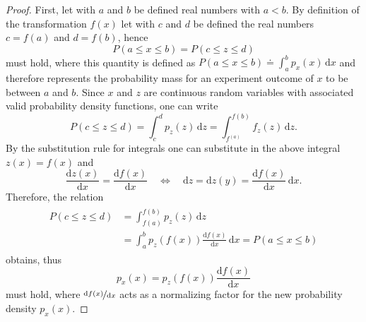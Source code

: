 \documentclass[a4paper,12pt]{report}
\begin{document}
\begin{proof}
First, let with $a$ and $b$ be defined real numbers with $a<b$. By definition of the transformation $f(x)$ let with $c$ and $d$ be defined the real numbers $c = f(a)$ and $d=f(b)$, hence \begin{equation}
P(a \leq x \leq b) = P(c \leq z \leq d)
\end{equation} must hold, where this quantity is defined as $P(a \leq x \leq b) \doteq \int_a^b p_x(x)\,\mathrm{d}x$ and therefore represents the probability mass for an experiment outcome of $x$ to be between $a$ and $b$. Since $x$ and $z$ are continuous random variables with associated valid probability density functions, one can write \begin{equation}
P(c \leq z \leq d) = \int_c^d p_z(z)\,\mathrm{d}z = \int_{f^(a)}^{f(b)}f_z(z)\,\mathrm{d}z.
\end{equation} By the substitution rule for integrals one can substitute in the above integral $z(x) = f(x)$ and \begin{equation}
\frac{\mathrm{d}z(x)}{\mathrm{d}x} = \frac{\mathrm{d}f(x)}{\mathrm{d}x} \quad \Leftrightarrow \quad \mathrm{d}z=\mathrm{d}z(y) = \frac{\mathrm{d}f(x)}{\mathrm{d}x}\,\mathrm{d}x.
\end{equation} Therefore, the relation \begin{align}\begin{aligned}
P(c \leq z \leq d) &= \int_{f(a)}^{f(b)}p_z(z)\,\mathrm{d}z \\ &= \int_{a}^{b}p_z(f(x))\frac{\mathrm{d}f(x)}{\mathrm{d}x}\,\mathrm{d}x = P(a \leq x \leq b)
\end{aligned}\end{align} obtains, thus
\begin{equation}
p_x(x) = p_z(f(x))\frac{\mathrm{d}f(x)}{\mathrm{d}x}
\end{equation}
must hold, where $\nicefrac{\mathrm{d}f(x)}{\mathrm{d}x}$ acts as a normalizing factor for the new probability density $p_x(x)$.
\end{proof}
\end{document}
